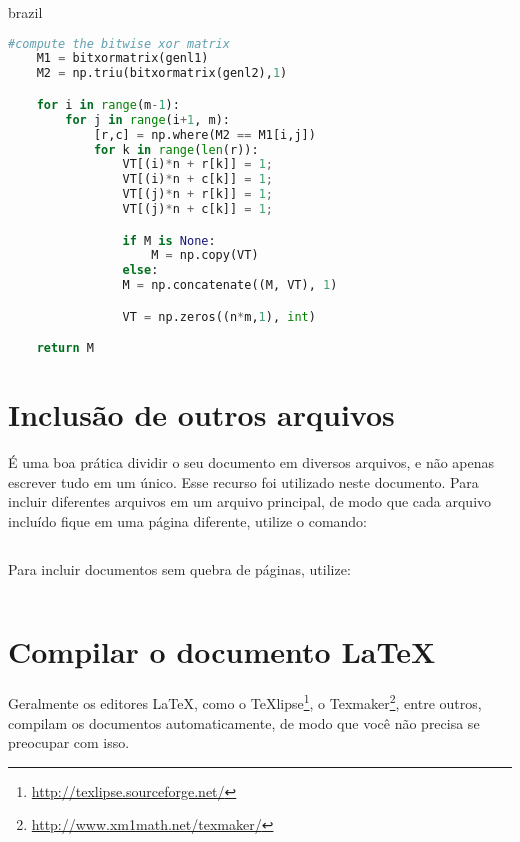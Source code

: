 \begin{otherlanguage*}{brazil}
\begin{lstlisting}[language=Python, caption=Python example]
    #compute the bitwise xor matrix
    M1 = bitxormatrix(genl1)
    M2 = np.triu(bitxormatrix(genl2),1)

    for i in range(m-1):
        for j in range(i+1, m):
            [r,c] = np.where(M2 == M1[i,j])
            for k in range(len(r)):
                VT[(i)*n + r[k]] = 1;
                VT[(i)*n + c[k]] = 1;
                VT[(j)*n + r[k]] = 1;
                VT[(j)*n + c[k]] = 1;

                if M is None:
                    M = np.copy(VT)
                else:
                M = np.concatenate((M, VT), 1)

                VT = np.zeros((n*m,1), int)

    return M
\end{lstlisting}




\section{Inclusão de outros arquivos}\label{sec-include}

É uma boa prática dividir o seu documento em diversos arquivos, e não
apenas escrever tudo em um único. Esse recurso foi utilizado neste
documento. Para incluir diferentes arquivos em um arquivo principal,
de modo que cada arquivo incluído fique em uma página diferente, utilize o
comando:

\begin{lstlisting}[language=tex]
         % sem a extensão .tex
\end{lstlisting}

Para incluir documentos sem quebra de páginas, utilize:

\begin{lstlisting}[language=tex]
         % sem a extensão .tex
\end{lstlisting}

\section{Compilar o documento \LaTeX{}}

 

Geralmente os editores \LaTeX{}, como o
TeXlipse\footnote{\url{http://texlipse.sourceforge.net/}}, o
Texmaker\footnote{\url{http://www.xm1math.net/texmaker/}}, entre outros,
compilam os documentos automaticamente, de modo que você não precisa se
preocupar com isso.


\end{otherlanguage*}
